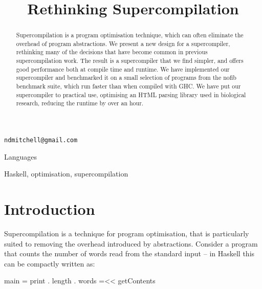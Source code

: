 \documentclass[draft]{sigplanconf}
\begin{document}

\titlebanner{\today{} - \currenttime{}}        %
\preprintfooter{}   %

\title{Rethinking Supercompilation}

           {\verb"ndmitchell@gmail.com"}

\maketitle

\begin{abstract}
Supercompilation is a program optimisation technique, which can often eliminate the overhead of program abstractions. We present a new design for a supercompiler, rethinking many of the decisions that have become common in previous supercompilation work. The result is a supercompiler that we find simpler, and offers good performance both at compile time and runtime. We have implemented our supercompiler and benchmarked it on a small selection of programs from the nofib benchmark suite, which run faster than when compiled with GHC. We have put our supercompiler to practical use, optimising an HTML parsing library used in biological research, reducing the runtime by over an hour.
\end{abstract}


\terms
Languages

\keywords
Haskell, optimisation, supercompilation

\section{Introduction}


Supercompilation is a technique for program optimisation, that is particularly suited to removing the overhead introduced by abstractions. Consider a program that counts the number of words read from the standard input -- in Haskell \cite{haskell} this can be compactly written as:

\begin{code}
main = print . length . words =<< getContents
\end{code}
\end{document}
